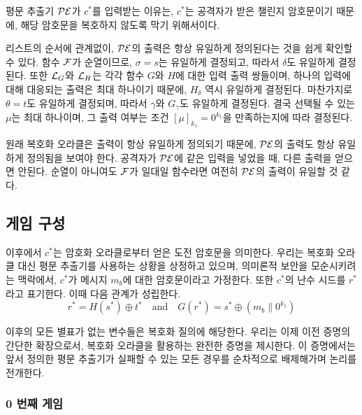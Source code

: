\begin{memo}
	평문 추출기 $\mathcal{PE}$가 $c^*$를 입력받는 이유는, $c^*$는 공격자가 받은
	챌린지 암호문이기 때문에, 해당 암호문을 복호하지 않도록 막기 위해서이다.
\end{memo}

리스트의 순서에 관계없이, $\mathcal{PE}$의 출력은 항상 유일하게 정의된다는 것을 쉽게
확인할 수 있다. 함수 $\mathcal{F}$가 순열이므로, $\sigma = s$는 유일하게 결정되고, 따라서
$\delta$도 유일하게 결정된다. 또한 $\mathcal{L}_{G}$와 $\mathcal{L}_{H}$는 각각 함수 $G$와 $H$에
대한 입력 출력 쌍들이며, 하나의 입력에 대해 대응되는 출력은 최대 하나이기
때문에, $H_\delta$ 역시 유일하게 결정된다. 마찬가지로 $\theta = t$도 유일하게
결정되며, 따라서 $\gamma$와 $G_\gamma$도 유일하게 결정된다. 결국 선택될 수 있는
$\mu$는 최대 하나이며, 그 출력 여부는 조건 $[\mu]_{k_1} = 0^{k_1}$을
만족하는지에 따라 결정된다.

\begin{memo}
	원래 복호화 오라클은 출력이 항상 유일하게 정의되기 때문에, $\mathcal{PE}$의 출력도
	항상 유일하게 정의됨을 보여야 한다. 공격자가 $\mathcal{PE}$에 같은 입력을 넣었을 때,
	다른 출력을 얻으면 안된다. 순열이 아니여도 $\mathcal{F}$가 일대일 함수라면 여전히
	$\mathcal{PE}$의 출력이 유일할 것 같다.
\end{memo}

\newpage
\subsection{게임 구성}

이후에서 $c^*$는 암호화 오라클로부터 얻은 도전 암호문을 의미한다. 우리는 복호화
오라클 대신 평문 추출기를 사용하는 상황을 상정하고 있으며, 의미론적 보안을
모순시키려는 맥락에서, $c^*$가 메시지 $m_b$에 대한 암호문이라고 가정한다. 또한
$c^*$의 난수 시드를 $r^*$라고 표기한다. 이때 다음 관계가 성립한다.
$$
	r^* = H(s^*) \oplus t^* \quad \text{and} \quad G(r^*) = s^* \oplus (m_b \parallel 0^{k_1})
$$

이후의 모든 별표가 없는 변수들은 복호화 질의에 해당한다. 우리는 이제 이전 증명의
간단한 확장으로서, 복호화 오라클을 활용하는 완전한 증명을 제시한다. 이
증명에서는 앞서 정의한 평문 추출기가 실패할 수 있는 모든 경우를 순차적으로
배제해가며 논리를 전개한다.

\subsubsection{0 번째 게임}

